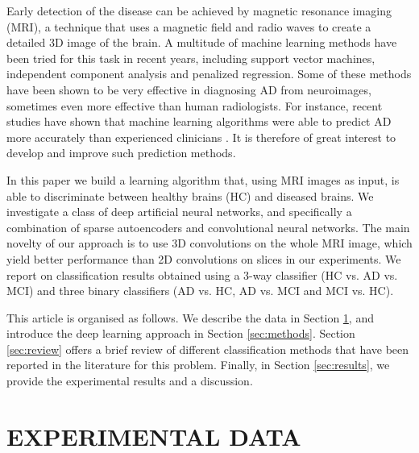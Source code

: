 \documentclass[a4paper,10pt]{article}
\begin{document}
Early detection of the disease can be achieved by magnetic resonance imaging (MRI), a technique that uses a magnetic field and radio waves to create a detailed 3D image of the brain. A multitude of machine learning methods have been tried for this task in recent years, including support vector machines, independent component analysis and penalized regression. Some of these methods have been shown to be very effective in diagnosing AD from neuroimages, sometimes even more effective than human radiologists. For instance, recent studies have shown that machine learning algorithms were able to predict AD more accurately than experienced clinicians \cite{kloppel}. It is therefore of great interest to
develop and improve such prediction methods.

In this paper we build a learning algorithm that, using MRI images as input, is able to discriminate between healthy brains (HC) and diseased brains. We investigate a class of deep artificial neural networks, and specifically a combination of sparse autoencoders and convolutional neural networks. The main novelty of our approach is to use 3D convolutions on the whole MRI image, which yield better performance than 2D convolutions on slices in our experiments. We report on classification results obtained using a 3-way classifier (HC vs. AD vs. MCI) and three binary classifiers (AD vs. HC, AD vs. MCI and MCI vs. HC).

This article is organised as follows. We describe the data in Section \ref{sec:data}, and introduce the deep learning approach in Section \ref{sec:methods}. Section \ref{sec:review} offers a brief review of different classification methods that have been reported in the literature for this problem. Finally, in Section \ref{sec:results}, we provide the experimental results and a discussion.

\section{\uppercase{Experimental Data}}\label{sec:data}
\end{document}
